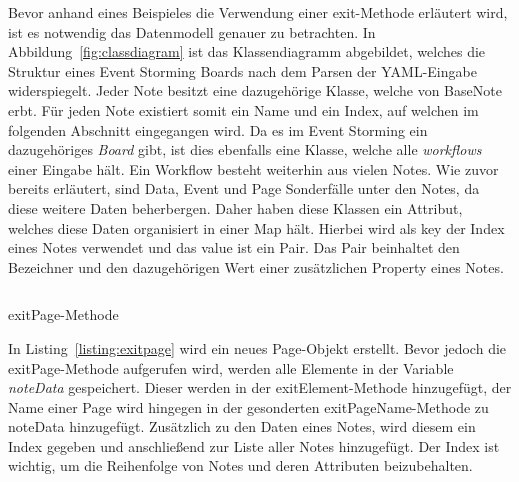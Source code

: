 Bevor anhand eines Beispieles die Verwendung einer exit-Methode erläutert wird, ist es notwendig das Datenmodell genauer zu betrachten.
In Abbildung~\ref{fig:classdiagram} ist das Klassendiagramm abgebildet, welches die Struktur eines Event Storming Boards nach dem Parsen der YAML-Eingabe widerspiegelt.
Jeder Note besitzt eine dazugehörige Klasse, welche von BaseNote erbt.
Für jeden Note existiert somit ein Name und ein Index, auf welchen im folgenden Abschnitt eingegangen wird.
Da es im Event Storming ein dazugehöriges \textit{Board} gibt, ist dies ebenfalls eine Klasse, welche alle \textit{workflows} einer Eingabe hält.
Ein Workflow besteht weiterhin aus vielen Notes.
Wie zuvor bereits erläutert, sind Data, Event und Page Sonderfälle unter den Notes, da diese weitere Daten beherbergen.
Daher haben diese Klassen ein Attribut, welches diese Daten organisiert in einer Map hält.
Hierbei wird als key der Index eines Notes verwendet und das value ist ein Pair.
Das Pair beinhaltet den Bezeichner und den dazugehörigen Wert einer zusätzlichen Property eines Notes.

\begin{listing}[!ht]
    \inputminted[xleftmargin=20pt,linenos,firstnumber=106]{java}{listings/3.1.3/ExitPage.java}
    \caption{exitPage-Methode}
    \label{listing:exitpage}
\end{listing}

In Listing~\ref{listing:exitpage} wird ein neues Page-Objekt erstellt.
Bevor jedoch die exitPage-Methode aufgerufen wird, werden alle Elemente in der Variable \textit{noteData} gespeichert.
Dieser werden in der exitElement-Methode hinzugefügt, der Name einer Page wird hingegen in der gesonderten exitPageName-Methode zu noteData hinzugefügt.
Zusätzlich zu den Daten eines Notes, wird diesem ein Index gegeben und anschließend zur Liste aller Notes hinzugefügt.
Der Index ist wichtig, um die Reihenfolge von Notes und deren Attributen beizubehalten.
